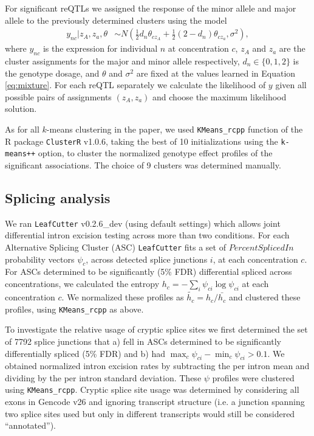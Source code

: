 \documentclass{article}
\begin{document}
For significant reQTLs we assigned the response of the minor allele and major allele to the previously determined clusters using the model
\begin{align*}
y_{nc} | z_A,z_a, \theta &\sim N\left( \frac12 d_n \theta_{cz_A} + \frac12 (2 - d_n) \theta_{cz_a}, \sigma^2 \right),
\end{align*}
where $y_{nc}$ is the expression for individual $n$ at concentration $c$, $z_A$ and $z_a$ are the cluster assignments for the major and minor allele respectively, $d_n \in \{0,1,2\}$ is the genotype dosage, and $\theta$ and $\sigma^2$ are fixed at the values learned in Equation \ref{eq:mixture}. For each reQTL separately we calculate the likelihood of $y$ given all possible pairs of assignments $(z_A,z_a)$ and choose the maximum likelihood solution. 

As for all $k$-means clustering in the paper, we used \texttt{KMeans\_rcpp} function of the R package \texttt{ClusterR} v1.0.6, taking the best of 10 initializations using the \texttt{k-means++} option, to cluster the normalized genotype effect profiles of the significant associations. The choice of 9 clusters was determined manually. 

\subsection*{Splicing analysis}

We ran \texttt{LeafCutter} v0.2.6\_dev (using default settings) which allows joint differential intron excision testing across more than two conditions. For each Alternative Splicing Cluster (ASC) \texttt{LeafCutter} fits a set of $Percent Spliced In$ probability vectors $\psi_{c}$, across detected splice junctions $i$, at each concentration $c$. For ASCs determined to be significantly (5\% FDR) differential spliced across concentrations, we calculated the entropy $h_c = -\sum_i \psi_{ci} \log \psi_{ci}$ at each concentration $c$. We normalized these profiles as $\tilde{h_c} = h_c / \bar{h_c}$ and clustered these profiles, using \texttt{KMeans\_rcpp} as above. 

To investigate the relative usage of cryptic splice sites we first determined the set of 7792 splice junctions that a) fell in ASCs determined to be significantly differentially spliced (5\% FDR) and b) had $\max_c \psi_{ci} - \min_c \psi_{ci} > 0.1$. We obtained normalized intron excision rates by subtracting the per intron mean and dividing by the per intron standard deviation. These $\psi$ profiles were clustered using \texttt{KMeans\_rcpp}. Cryptic splice site usage was determined by considering all exons in Gencode v26 and ignoring transcript structure (i.e. a junction spanning two splice sites used but only in different transcripts would still be considered ``annotated''). 
\end{document}
